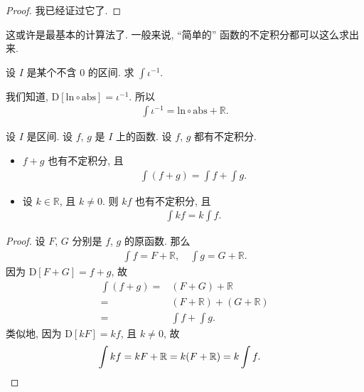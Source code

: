 \begin{proof}
    我已经证过它了.
\end{proof}

这或许是最基本的计算法了.
一般来说, ``简单的'' 函数的不定积分都可以这么求出来.

\begin{example}
    设 $I$ 是某个不含 $0$ 的区间.
    求 $\int {\iota^{-1}}$.

    我们知道,
    $\mathrm{D}[\mathrm{ln} \circ \mathrm{abs}] = \iota^{-1}$.
    所以
    \begin{align*}
        \int {\iota^{-1}} = \mathrm{ln} \circ \mathrm{abs} + \mathbb{R}.
    \end{align*}
\end{example}

\begin{theorem}
    设 $I$ 是区间.
    设 $f$, $g$ 是 $I$ 上的函数.
    设 $f$, $g$ 都有不定积分.
    \begin{itemize}
        \item $f + g$ 也有不定积分, 且
              \begin{align*}
                  \int {(f + g)} = \int {f} + \int {g}.
              \end{align*}
        \item 设 $k \in \mathbb{R}$, 且 $k \neq 0$.
              则 $kf$ 也有不定积分, 且
              \begin{align*}
                  \int {kf} = k \int{f}.
              \end{align*}
    \end{itemize}
\end{theorem}

\begin{proof}
    设 $F$, $G$ 分别是 $f$, $g$ 的原函数.
    那么
    \begin{align*}
        \int {f} = F + \mathbb{R}, \quad \int {g} = G + \mathbb{R}.
    \end{align*}
    因为 $\mathrm{D}[F + G] = f + g$, 故
    \begin{align*}
        \int {(f + g)}
        = {} & (F + G) + \mathbb{R}                \\
        = {} & (F + \mathbb{R}) + (G + \mathbb{R}) \\
        = {} & \int {f} + \int {g}.
    \end{align*}
    类似地, 因为 $\mathrm{D}[kF] = kf$, 且 $k \neq 0$, 故
    \begin{align*}
         & {\int {kf}} = kF + \mathbb{R} = k(F + \mathbb{R}) = k\int {f}. \qedhere
    \end{align*}
\end{proof}

